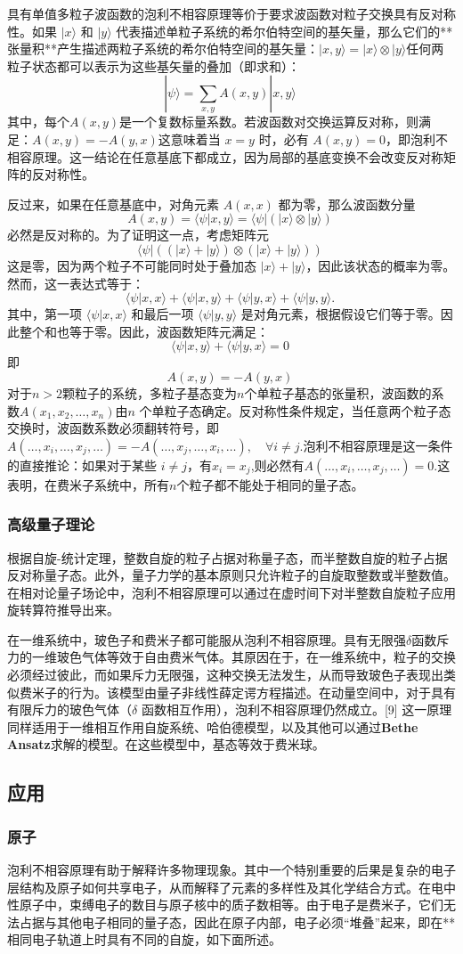 具有单值多粒子波函数的泡利不相容原理等价于要求波函数对粒子交换具有反对称性。如果 \( |x\rangle \) 和 \( |y\rangle \) 代表描述单粒子系统的希尔伯特空间的基矢量，那么它们的**张量积**产生描述两粒子系统的希尔伯特空间的基矢量：\(|x, y\rangle = |x\rangle \otimes |y\rangle\)任何两粒子状态都可以表示为这些基矢量的叠加（即求和）：  
\[
|\psi\rangle = \sum_{x,y} A(x,y) |x,y\rangle~
\]
其中，每个\(A(x, y)\)是一个复数标量系数。若波函数对交换运算反对称，则满足：\(A(x, y) = -A(y, x)\)这意味着当 \( x = y \) 时，必有 \( A(x, y) = 0 \)，即泡利不相容原理。这一结论在任意基底下都成立，因为局部的基底变换不会改变反对称矩阵的反对称性。

反过来，如果在任意基底中，对角元素 \( A(x, x) \) 都为零，那么波函数分量  
\[
A(x, y) = \langle \psi | x, y \rangle = \langle \psi | ( |x\rangle \otimes |y\rangle )~
\]
必然是反对称的。为了证明这一点，考虑矩阵元  
\[
\langle \psi | ( (|x\rangle + |y\rangle ) \otimes (|x\rangle + |y\rangle ) )~
\]
这是零，因为两个粒子不可能同时处于叠加态 \( |x\rangle + |y\rangle \)，因此该状态的概率为零。然而，这一表达式等于：  
\[
\langle \psi | x, x \rangle + \langle \psi | x, y \rangle + \langle \psi | y, x \rangle + \langle \psi | y, y \rangle.~
\]
其中，第一项 \( \langle \psi | x, x \rangle \) 和最后一项 \( \langle \psi | y, y \rangle \) 是对角元素，根据假设它们等于零。因此整个和也等于零。因此，波函数矩阵元满足：  
\[
\langle \psi | x, y \rangle + \langle \psi | y, x \rangle = 0~
\]
即  
\[
A(x, y) = -A(y, x)~
\]
对于\( n > 2 \)颗粒子的系统，多粒子基态变为\( n \)个单粒子基态的张量积，波函数的系数\(A(x_1, x_2, \dots, x_n)\)由\( n \) 个单粒子态确定。反对称性条件规定，当任意两个粒子态交换时，波函数系数必须翻转符号，即\(A(\dots, x_i, \dots, x_j, \dots) = -A(\dots, x_j, \dots, x_i, \dots), \quad \forall i \neq j\).泡利不相容原理是这一条件的直接推论：如果对于某些 \( i \neq j \)，有\(x_i = x_j\),则必然有\(A(\dots, x_i, \dots, x_j, \dots) = 0\).这表明，在费米子系统中，所有\( n \)个粒子都不能处于相同的量子态。
\subsubsection{高级量子理论} 
根据自旋-统计定理，整数自旋的粒子占据对称量子态，而半整数自旋的粒子占据反对称量子态。此外，量子力学的基本原则只允许粒子的自旋取整数或半整数值。在相对论量子场论中，泡利不相容原理可以通过在虚时间下对半整数自旋粒子应用旋转算符推导出来。

在一维系统中，玻色子和费米子都可能服从泡利不相容原理。具有无限强\(\delta\)函数斥力的一维玻色气体等效于自由费米气体。其原因在于，在一维系统中，粒子的交换必须经过彼此，而如果斥力无限强，这种交换无法发生，从而导致玻色子表现出类似费米子的行为。该模型由量子非线性薛定谔方程描述。在动量空间中，对于具有有限斥力的玻色气体（\(\delta\) 函数相互作用），泡利不相容原理仍然成立。[9] 这一原理同样适用于一维相互作用自旋系统、哈伯德模型，以及其他可以通过\textbf{Bethe Ansatz}求解的模型。在这些模型中，基态等效于费米球。
\subsection{应用}  
\subsubsection{原子} 
泡利不相容原理有助于解释许多物理现象。其中一个特别重要的后果是复杂的电子层结构及原子如何共享电子，从而解释了元素的多样性及其化学结合方式。在电中性原子中，束缚电子的数目与原子核中的质子数相等。由于电子是费米子，它们无法占据与其他电子相同的量子态，因此在原子内部，电子必须“堆叠”起来，即在**相同电子轨道上时具有不同的自旋，如下面所述。
